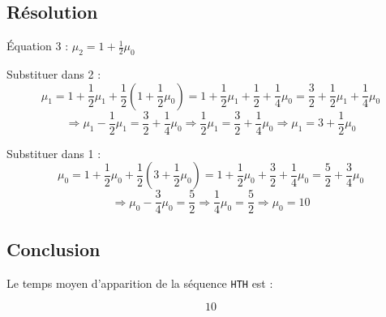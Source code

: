 \subsection*{Résolution}

Équation 3 : \( \mu_2 = 1 + \frac{1}{2} \mu_0 \)

Substituer dans 2 :
\[
\mu_1 = 1 + \frac{1}{2} \mu_1 + \frac{1}{2}(1 + \frac{1}{2} \mu_0)
= 1 + \frac{1}{2} \mu_1 + \frac{1}{2} + \frac{1}{4} \mu_0
= \frac{3}{2} + \frac{1}{2} \mu_1 + \frac{1}{4} \mu_0
\]
\[
\Rightarrow \mu_1 - \frac{1}{2} \mu_1 = \frac{3}{2} + \frac{1}{4} \mu_0
\Rightarrow \frac{1}{2} \mu_1 = \frac{3}{2} + \frac{1}{4} \mu_0
\Rightarrow \mu_1 = 3 + \frac{1}{2} \mu_0
\]

Substituer dans 1 :
\[
\mu_0 = 1 + \frac{1}{2} \mu_0 + \frac{1}{2}(3 + \frac{1}{2} \mu_0)
= 1 + \frac{1}{2} \mu_0 + \frac{3}{2} + \frac{1}{4} \mu_0
= \frac{5}{2} + \frac{3}{4} \mu_0
\]
\[
\Rightarrow \mu_0 - \frac{3}{4} \mu_0 = \frac{5}{2}
\Rightarrow \frac{1}{4} \mu_0 = \frac{5}{2}
\Rightarrow \mu_0 = 10
\]

\subsection*{Conclusion}

Le temps moyen d’apparition de la séquence \texttt{HTH} est :

\[
\boxed{10}
\]


